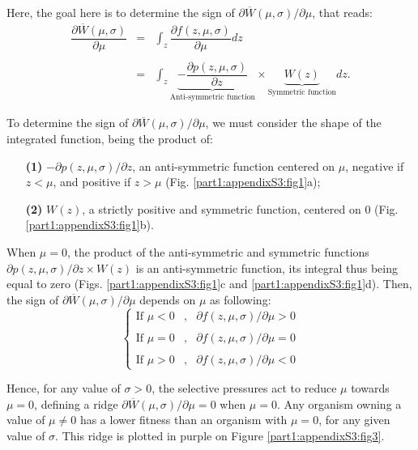 Here, the goal here is to determine the sign of $\partial \overline{W}(\mu,\sigma)/\partial \mu$, that reads:
\begin{equation}
\begin{array}{rcl}
\dfrac{\partial \overline{W}(\mu,\sigma)}{\partial \mu} & = & \displaystyle\int_z \dfrac{\partial f(z,\mu,\sigma)}{\partial \mu} dz\\\\
& = & \displaystyle\int_z \underbrace{-\dfrac{\partial p(z,\mu,\sigma)}{\partial z}}_{\text{Anti-symmetric function}} \times \underbrace{W(z)}_{\text{Symmetric function}} dz.
\end{array}
\label{eq:part1:mu_full_equation}
\end{equation}

To determine the sign of $\partial \overline{W}(\mu,\sigma)/\partial \mu$, we must consider the shape of the integrated function, being the product of:
\begin{enumerate}
\item[\textbf{(1)}] $-\partial p(z,\mu,\sigma)/\partial z$, an anti-symmetric function centered on $\mu$, negative if $z < \mu$, and positive if $z > \mu$ (Fig. \ref{part1:appendixS3:fig1}a);
\item[\textbf{(2)}] $W(z)$, a strictly positive and symmetric function, centered on 0  (Fig. \ref{part1:appendixS3:fig1}b).
\end{enumerate}

When $\mu=0$, the product of the anti-symmetric and symmetric functions $\partial p(z,\mu,\sigma)/\partial z \times W(z)$ is an anti-symmetric function, its integral thus being equal to zero (Figs. \ref{part1:appendixS3:fig1}c and \ref{part1:appendixS3:fig1}d). Then, the sign of $\partial \overline{W}(\mu,\sigma)/\partial \mu$ depends on $\mu$ as following:
\begin{equation}
\left\{
\begin{array}{rcl}
\text{If } \mu < 0 &,& \partial f(z,\mu,\sigma)/\partial \mu > 0\\\\
\text{If } \mu = 0 &,& \partial f(z,\mu,\sigma)/\partial \mu = 0\\\\
\text{If } \mu > 0 &,& \partial f(z,\mu,\sigma)/\partial \mu < 0
\end{array}
\right.
\end{equation}

Hence, for any value of $\sigma > 0$, the selective pressures act to reduce $\mu$ towards $\mu=0$, defining a ridge $\partial \overline{W}(\mu,\sigma)/\partial \mu = 0$ when $\mu = 0$. Any organism owning a value of $\mu \neq 0$ has a lower fitness than an organism with $\mu = 0$, for any given value of $\sigma$. This ridge is plotted in purple on Figure \ref{part1:appendixS3:fig3}.

